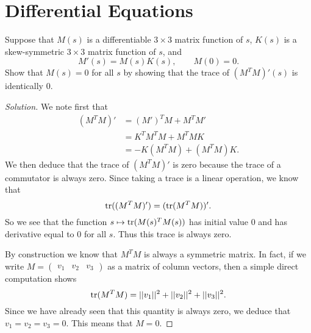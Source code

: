 \documentclass[Shifrin_Solutions_Spring_2015]{subfiles}
\begin{document}
\section{Differential Equations}

\begin{exercise}Suppose that $M(s)$ is a differentiable $3\times 3$ matrix function of $s$, $K(s)$ is a skew-symmetric $3\times 3$ matrix function of $s$, and
\[
M'(s) = M(s)K(s), \qquad M(0)=0 .
\]
Show that $M(s) = 0$ for all $s$ by showing that the trace of $(M^TM)'(s)$ is identically $0$.
\end{exercise}

\begin{proof}[Solution]
We note first that
\[
\begin{split}
(M^TM)' & = (M')^T M + M^T M' \\
	& = K^T M^T M + M^T M K \\
	& = - K (M^TM) + (M^TM)K .
\end{split}
\]
We then deduce that the trace of $(M^TM)'$ is zero because the trace of a commutator is always zero. Since taking a trace is a linear operation, we know that
\[
\operatorname{\mathrm{tr}}((M^T M)') = (\operatorname{\mathrm{tr}}(M^T M))' .
\]
So we see that the function $s \mapsto \operatorname{\mathrm{tr}}(M(s)^TM(s))$ has initial value $0$ and has derivative equal to $0$ for all $s$. Thus this trace is always zero.

By construction we know that $M^TM$ is always a symmetric matrix. In fact, if we write $M = \begin{pmatrix} v_1 & v_2 & v_3 \end{pmatrix}$ as a matrix of column vectors, then a simple direct computation shows
\[
\operatorname{\mathrm{tr}}(M^T M) = ||v_1||^2 + ||v_2||^2 + ||v_3||^2 .
\]
Since we have already seen that this quantity is always zero, we deduce that $v_1 = v_2  = v_3 = 0$. This means that $M = 0$.
\end{proof}

\vspace{1cm}

\end{document}
